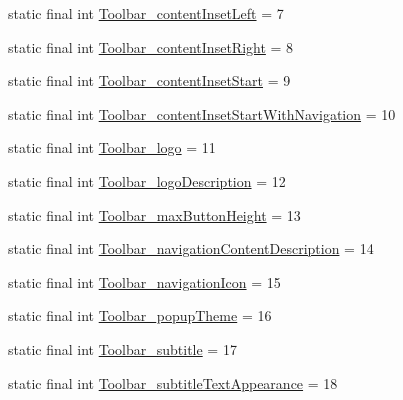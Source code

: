 \begin{DoxyCompactItemize}
\item 
static final int \mbox{\hyperlink{classandroid_1_1support_1_1v7_1_1appcompat_1_1_r_1_1styleable_a9708be86160ef8cd90d97a2335c4deaa}{Toolbar\+\_\+content\+Inset\+Left}} = 7
\item 
static final int \mbox{\hyperlink{classandroid_1_1support_1_1v7_1_1appcompat_1_1_r_1_1styleable_a9e40d33c2ba6473ca0c5301d5f1f9b4a}{Toolbar\+\_\+content\+Inset\+Right}} = 8
\item 
static final int \mbox{\hyperlink{classandroid_1_1support_1_1v7_1_1appcompat_1_1_r_1_1styleable_a8277724d6d61a0810ffe598e5aa92c49}{Toolbar\+\_\+content\+Inset\+Start}} = 9
\item 
static final int \mbox{\hyperlink{classandroid_1_1support_1_1v7_1_1appcompat_1_1_r_1_1styleable_ad3a26b18e2dcb44a65bac712d9ff3b6d}{Toolbar\+\_\+content\+Inset\+Start\+With\+Navigation}} = 10
\item 
static final int \mbox{\hyperlink{classandroid_1_1support_1_1v7_1_1appcompat_1_1_r_1_1styleable_aa6cd97acb16dc1939297d6b55144511a}{Toolbar\+\_\+logo}} = 11
\item 
static final int \mbox{\hyperlink{classandroid_1_1support_1_1v7_1_1appcompat_1_1_r_1_1styleable_a90d4140553a7127f0022db99faa5c853}{Toolbar\+\_\+logo\+Description}} = 12
\item 
static final int \mbox{\hyperlink{classandroid_1_1support_1_1v7_1_1appcompat_1_1_r_1_1styleable_affe8ecfe808e4ef6f9ec7d197b85487b}{Toolbar\+\_\+max\+Button\+Height}} = 13
\item 
static final int \mbox{\hyperlink{classandroid_1_1support_1_1v7_1_1appcompat_1_1_r_1_1styleable_a3ba85c003fe3fb0dbf01310aa5be8787}{Toolbar\+\_\+navigation\+Content\+Description}} = 14
\item 
static final int \mbox{\hyperlink{classandroid_1_1support_1_1v7_1_1appcompat_1_1_r_1_1styleable_a84175030a2bc34232cc0633a27da4f68}{Toolbar\+\_\+navigation\+Icon}} = 15
\item 
static final int \mbox{\hyperlink{classandroid_1_1support_1_1v7_1_1appcompat_1_1_r_1_1styleable_a86dd147aa8ab286860ac21db4ebd64a5}{Toolbar\+\_\+popup\+Theme}} = 16
\item 
static final int \mbox{\hyperlink{classandroid_1_1support_1_1v7_1_1appcompat_1_1_r_1_1styleable_adbd60df7938c772e9f8a86c5e19a8d1e}{Toolbar\+\_\+subtitle}} = 17
\item 
static final int \mbox{\hyperlink{classandroid_1_1support_1_1v7_1_1appcompat_1_1_r_1_1styleable_ad1efd3d21df430b2222c4610c0943e32}{Toolbar\+\_\+subtitle\+Text\+Appearance}} = 18

\end{DoxyCompactItemize}
